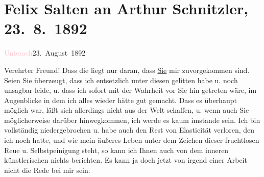 

\renewcommand{\erwaehntePersonen}{Personen: Richard Beer-Hofmann, Hugo von Hofmannsthal}
\renewcommand{\erwaehnteOrte}{Orte: Bahnhof, Unterach am Attersee, Wien}
\renewcommand{\erwaehnteWerke}{}
\section[Felix Salten an Arthur Schnitzler, 23. 8. 1892]{Felix Salten an Arthur Schnitzler, 23. 8. 1892}
\nopagebreak{}
\rehead{ }\normalsize\beginnumbering{}
\toendnotes[C]{\smallbreak\pagebreak[2]}
\toendnotes[C]{\smallbreak}
\pstart
           \raggedleft{}{\pb}\textcolor{pink}{Unterach}{}\ledrightnote{\textcolor{pink}{Bahnhof}}{ }23. August 1892\pend
           
\pstart
           Verehrter Freund! Dass die \label{K_L03113-1v}\label{K_L03113-1h} liegt nur daran, dass \uline{Sie} mir zuvorgekommen
               sind. Seien Sie überzeugt, dass ich entsetzlich unter diesen \label{K_L03113-2v}\label{K_L03113-2h} gelitten habe u. noch unsagbar leide, u. dass ich sofort mit der Wahrheit vor
               Sie hin getreten wäre, im Augenblicke in dem ich alles wieder hätte gut gemacht. Dass
               es überhaupt möglich war, läßt sich allerdings nicht aus der Welt schaffen, u. wenn
               auch Sie möglicher{\pb}weise darüber hinwegkommen, ich werde
               es kaum imstande sein. Ich bin vollständig niedergebrochen u. habe auch
               den Rest von Elasticität verloren, den ich noch hatte, und wie mein äußeres
               Leben unter dem Zeichen dieser fruchtlosen
               Reue u. Selbstpeinigung steht, so kann ich Ihnen auch von dem inneren
               künstlerischen nichts berichten. Es kann ja doch jetzt von irgend einer 
               Arbeit nicht die Rede bei mir sein.\pend
           

